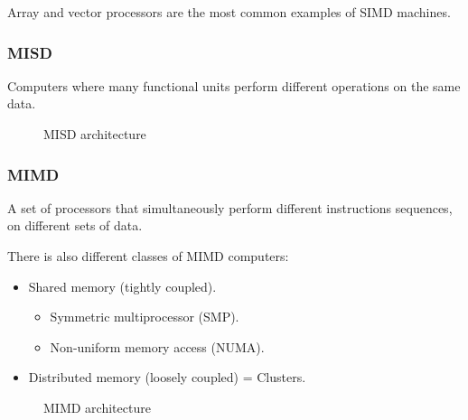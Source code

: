 Array and vector processors are the most common examples of SIMD machines.
\subsubsection{MISD}
Computers where many functional units perform different operations on the same data.
\begin{figure}[H]
  \centering
  \caption{MISD architecture}
  \label{fig:MISD}
\end{figure}

\subsubsection{MIMD}
A set of processors that simultaneously perform different instructions sequences, on different sets of data.

There is also different classes of MIMD computers:
\begin{itemize}
  \item Shared memory (tightly coupled).
  \begin{itemize}
  \item Symmetric multiprocessor (SMP).
  \item Non-uniform memory access (NUMA).
  \end{itemize}
  \item Distributed memory (loosely coupled) = Clusters.
\end{itemize}

\begin{figure}[H]
  \centering
  \caption{MIMD architecture}
  \label{fig:MIMD}
\end{figure}

